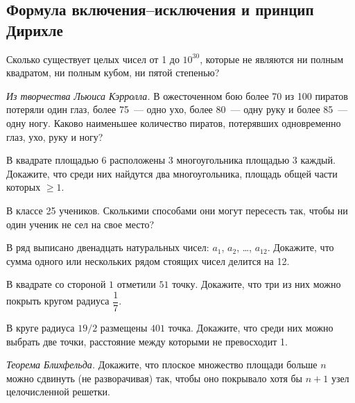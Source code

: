 \subsection*{Формула включения--исключения и принцип Дирихле}

\begin{problems}

\item
Сколько существует целых чисел от 1 до $10^{30}$, которые не являются ни полным квадратом, ни полным кубом, ни пятой степенью?

\item\emph{Из творчества Льюиса Кэрролла.}
В ожесточенном бою более 70 из 100 пиратов потеряли один глаз, более 75~---
одно ухо, более 80~--- одну руку и более 85~--- одну ногу.
Каково наименьшее количество пиратов, потерявших одновременно глаз, ухо, руку и
ногу?

\item
В квадрате площадью 6 расположены 3 многоугольника площадью 3 каждый.
Докажите, что среди них найдутся два многоугольника, площадь общей части
которых $\geq 1$.

\item
В классе 25 учеников.
Сколькими способами они могут пересесть так, чтобы ни один ученик не сел на
свое место?

\item
В ряд выписано двенадцать натуральных чисел:
$a_1$, $a_2$, \ldots, $a_{12}$.
Докажите, что сумма одного или нескольких рядом стоящих чисел делится на 12.%

\item
В квадрате со стороной $1$ отметили $51$ точку.
Докажите, что три из них можно покрыть кругом радиуса $\dfrac{1}{7}$.

\item
В круге радиуса $19 / 2$ размещены $401$ точка.
Докажите, что среди них можно выбрать две точки, расстояние между которыми не
превосходит 1.

\item
\emph{Теорема Блихфельда.}
Докажите, что плоское множество площади больше $n$ можно сдвинуть
(не разворачивая) так, чтобы оно покрывало хотя бы $n + 1$ узел целочисленной
решетки.

\end{problems}

